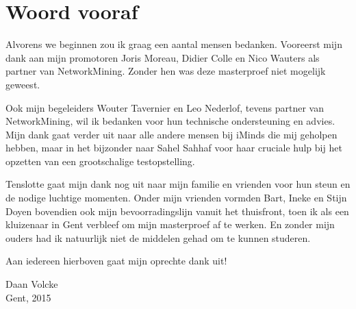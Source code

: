 \chapter*{Woord vooraf}

Alvorens we beginnen zou ik graag een aantal mensen bedanken.
Vooreerst mijn dank aan mijn promotoren Joris Moreau, Didier Colle en Nico Wauters als partner van NetworkMining.
Zonder hen was deze masterproef niet mogelijk geweest.

Ook mijn begeleiders Wouter Tavernier en Leo Nederlof, tevens partner van NetworkMining, wil ik bedanken voor hun technische ondersteuning en advies.
Mijn dank gaat verder uit naar alle andere mensen bij iMinds die mij geholpen hebben,
maar in het bijzonder naar Sahel Sahhaf voor haar cruciale hulp bij het opzetten van een grootschalige testopstelling.

Tenslotte gaat mijn dank nog uit naar mijn familie en vrienden voor hun steun en de nodige luchtige momenten.
Onder mijn vrienden vormden Bart, Ineke en Stijn Doyen bovendien ook mijn bevoorradingslijn vanuit het thuisfront, toen ik als een kluizenaar in Gent verbleef om mijn masterproef af te werken.
En zonder mijn ouders had ik natuurlijk niet de middelen gehad om te kunnen studeren.


Aan iedereen hierboven gaat mijn oprechte dank uit!


\begin{flushright}
Daan Volcke \\
Gent, 2015
\end{flushright}

